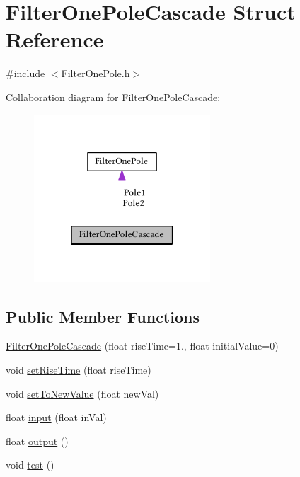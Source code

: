 \hypertarget{struct_filter_one_pole_cascade}{}\section{Filter\+One\+Pole\+Cascade Struct Reference}
\label{struct_filter_one_pole_cascade}


{\ttfamily \#include $<$Filter\+One\+Pole.\+h$>$}



Collaboration diagram for Filter\+One\+Pole\+Cascade\+:\nopagebreak
\begin{figure}[H]
\begin{center}
\leavevmode
\includegraphics[width=187pt]{struct_filter_one_pole_cascade__coll__graph}
\end{center}
\end{figure}
\subsection*{Public Member Functions}
\begin{DoxyCompactItemize}
\item 
\hyperlink{struct_filter_one_pole_cascade_a57f396fd01e54c8a6f3d3a6213b4d5a6}{Filter\+One\+Pole\+Cascade} (float rise\+Time=1., float initial\+Value=0)
\item 
void \hyperlink{struct_filter_one_pole_cascade_a06aed75defb8dc7cd252436944ca0baf}{set\+Rise\+Time} (float rise\+Time)
\item 
void \hyperlink{struct_filter_one_pole_cascade_a1bcac6613d187073873a825d9826ed82}{set\+To\+New\+Value} (float new\+Val)
\item 
float \hyperlink{struct_filter_one_pole_cascade_ae35052126bde0f0f197317b2ad003d26}{input} (float in\+Val)
\item 
float \hyperlink{struct_filter_one_pole_cascade_ae8ba6b966183057560bb0d84e3ea549a}{output} ()
\item 
void \hyperlink{struct_filter_one_pole_cascade_a48b7253c9eec2765bce755b6fc985e34}{test} ()
\end{DoxyCompactItemize}
